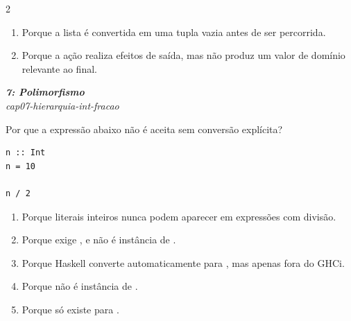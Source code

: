 \documentclass[a4paper,10pt,brazil]{article}
\begin{document}
\begin{multicols}{2}
\begin{enumerate}
  \item Porque a lista é convertida em uma tupla vazia antes de ser percorrida.

  \item Porque a ação realiza efeitos de saída, mas não produz um valor de domínio relevante ao final.


\end{enumerate}

\begin{flushright}
  \footnotesize
  \textit{\textbf{7: Polimorfismo}}\\
  \textit{cap07-hierarquia-int-fracao}\\

\end{flushright}
Por que a expressão abaixo não é aceita sem conversão explícita?

\begin{verbatim}
n :: Int
n = 10

n / 2
\end{verbatim}

\begin{enumerate}
  \item Porque literais inteiros nunca podem aparecer em expressões com divisão.
  \item Porque \haskellinline{(/)} exige , e  não é instância de .
  \item Porque Haskell converte automaticamente  para , mas apenas fora do GHCi.
  \item Porque  não é instância de .
  \item Porque \haskellinline{(/)} só existe para .

\end{enumerate}


\end{multicols}
\end{document}
